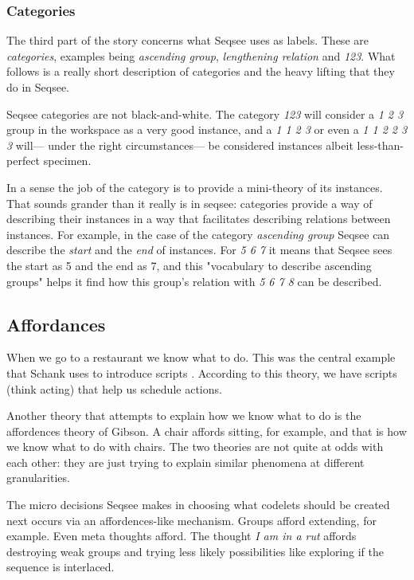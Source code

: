 \documentclass[letterpaper]{article}
\begin{document}
\subsubsection{Categories}
The third part of the story concerns what Seqsee uses as labels.  These are \emph{categories}, examples being \emph{ascending group}, \emph{lengthening relation} and \emph{123}.  What follows is a really short description of categories and the heavy lifting that they do in Seqsee.

Seqsee categories are not black-and-white.  The category \emph{123} will consider a \emph{1 2 3} group in the workspace as a very good instance, and a \emph{1 1 2 3} or even a \emph{1 1 2 2 3 3} will--- under the right circumstances--- be considered instances albeit less-than-perfect specimen.

In a sense the job of the category is to provide a mini-theory of its instances.  That sounds grander than it really is in seqsee: categories provide a way of describing their instances in a way that facilitates describing relations between instances.  For example, in the case of the category \emph{ascending group} Seqsee can describe the \emph{start} and the \emph{end} of instances.  For \emph{5 6 7} it means that Seqsee sees the start as 5 and the end as 7, and this "vocabulary to describe ascending groups" helps it find how this group's relation with \emph{5 6 7 8} can be described.

\subsection{Affordances}
\label{sec:affordances}

When we go to a restaurant we know what to do.  This was the central example that Schank uses to introduce scripts \cite{Schank+Abelson}.  According to this theory, we have scripts (think acting) that help us schedule actions. 

 Another theory that attempts to explain how we know what to do is the affordences theory of Gibson. A chair affords sitting, for example, and that is how we know what to do with chairs.  The two theories are not quite at odds with each other: they are just trying to explain similar phenomena at different granularities.

The micro decisions Seqsee makes in choosing what codelets should be created next occurs via an affordences-like mechanism. Groups afford extending, for example.  Even meta thoughts afford.  The thought \emph{I am in a rut} affords destroying weak groups and trying less likely possibilities like exploring if the sequence is interlaced.
\end{document}
